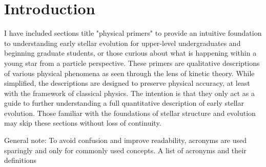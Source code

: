 \section{Introduction}
I have included sections title "physical primers" to provide an intuitive foundation to understanding early stellar evolution for upper-level undergraduates and beginning graduate students, or those curious about what is happening within a young star from a particle perspective. These primers are qualitative descriptions of various physical phenomena as seen through the lens of kinetic theory. While simplified, the descriptions are designed to preserve physical accuracy, at least with the framework of classical physics. The intention is that they only act as a guide to further understanding a full quantitative description of early stellar evolution. Those familiar with the foundations of stellar structure and evolution may skip these sections without loss of continuity.

General note: To avoid confusion and improve readability, acronyms are used sparingly and only for commonly used concepts. A list of acronyms and their definitions 